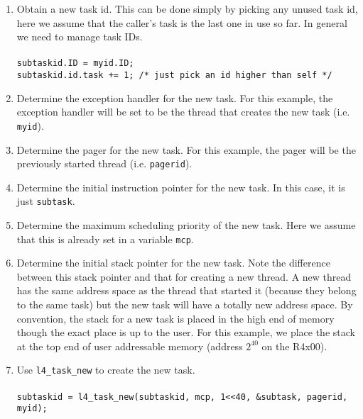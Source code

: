 \begin{enumerate}

\item Obtain a new task id. This can be done simply by picking
  any unused task id, here we assume that the caller's task is the
  last one in use so far. In general we need to manage
  task IDs. \\ \\
  \hspace*{10pt} {\footnotesize\verb+subtaskid.ID = myid.ID;+} \\
  \hspace*{10pt} {\footnotesize\verb"subtaskid.id.task += 1; /* just pick an id higher than self */"} \\
  
\item Determine the exception handler for the new task. For this
  example, the exception handler will be set to be the thread that
  creates the new task (i.e. {\footnotesize\verb+myid+}).
  
\item Determine the pager for the new task. For this example, the
  pager will be the previously started thread (i.e. {\footnotesize\verb+pagerid+}).
  
\item Determine the initial instruction pointer for the new task.  In
  this case, it is just {\footnotesize\verb+subtask+}.
  
\item Determine the maximum scheduling priority of the new task. Here
  we assume that this is already set in a variable {\footnotesize\verb+mcp+}.
  
\item Determine the initial stack pointer for the new task. Note the
  difference between this stack pointer and that for creating a new
  thread. A new thread has the same address space as the thread that
  started it (because they belong to the same task) but the new task
  will have a totally new address space. By convention, the stack for
  a new task is placed in the high end of memory though the exact
  place is up to the user. For this example, we place the stack at the
  top end of user addressable memory (address \(2^{40}\) on the R4x00).

\item Use {\footnotesize\verb+l4_task_new+} to create the new task. \\ \\ 
  \hspace*{10pt} {\footnotesize\verb+subtaskid = l4_task_new(subtaskid, mcp, 1<<40, &subtask, pagerid, myid);+}

\end{enumerate}



% 
